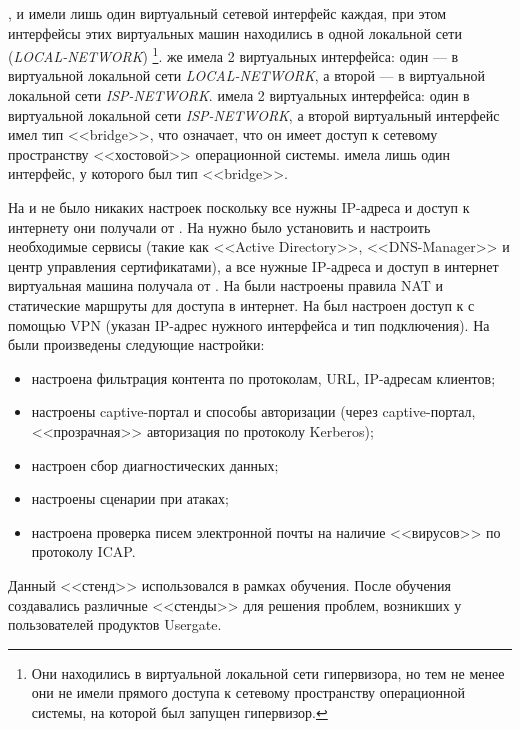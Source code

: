 \CLIA{}, \CLIB{} и \DC{} имели лишь один виртуальный сетевой интерфейс каждая, при этом интерфейсы этих виртуальных машин находились в одной локальной сети (\textit{LOCAL-NETWORK}) \footnote{Они находились в виртуальной локальной сети гипервизора, но тем не менее они не имели прямого доступа к сетевому пространству операционной системы, на которой был запущен гипервизор.}. \UTM{} же имела 2 виртуальных интерфейса: один --- в виртуальной локальной сети \textit{LOCAL-NETWORK}, а второй --- в виртуальной локальной сети \textit{ISP-NETWORK}. \ISP{} имела 2 виртуальных интерфейса: один в виртуальной локальной сети \textit{ISP-NETWORK}, а второй виртуальный интерфейс имел тип <<bridge>>, что означает, что он имеет доступ к сетевому пространству <<хостовой>> операционной системы. \CLIEXT{} имела лишь один интерфейс, у которого был тип <<bridge>>.
			
На \CLIA{} и \CLIB{} не было никаких настроек поскольку все нужны IP-адреса и доступ к интернету они получали от \UTM{}. На \DC{} нужно было установить и настроить необходимые сервисы (такие как <<Active Directory>>, <<DNS-Manager>> и центр управления сертификатами), а все нужные IP-адреса и доступ в интернет виртуальная машина получала от \UTM{}. На \ISP{} были настроены правила NAT и статические маршруты для доступа в интернет. На \CLIEXT{} был настроен доступ к \UTM{} с помощью VPN (указан IP-адрес нужного интерфейса \UTM{} и тип подключения). На \UTM{} были произведены следующие настройки:
		
\begin{itemize}
	\item настроена фильтрация контента по протоколам, URL, IP-адресам клиентов;
			
	\item настроены captive-портал и способы авторизации (через captive-портал, <<прозрачная>> авторизация по протоколу Kerberos);
			
	\item настроен сбор диагностических данных;
			
	\item настроены сценарии при атаках;
			
	\item настроена проверка писем электронной почты на наличие <<вирусов>> по протоколу ICAP.
\end{itemize}
		
Данный <<стенд>> использовался в рамках обучения. После обучения создавались различные <<стенды>> для решения проблем, возникших у пользователей продуктов Usergate.


